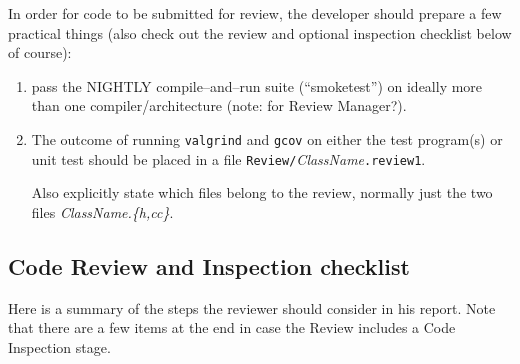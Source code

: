 \documentclass{article}
\begin{document}
In order for code to be submitted for review, the developer should prepare
a few practical things (also check out the review and optional
inspection checklist below of course):

\begin{enumerate}
\item
  pass the NIGHTLY compile--and--run suite (``smoketest'') on ideally more than
  one compiler/architecture (note: for Review Manager?).
\item
  The outcome of running {\tt valgrind} and {\tt gcov} on either the test
  program(s) or unit test should be placed in a file 
 {\tt Review/}{\it ClassName}{\tt .review1}.



Also explicitly state which files belong to the review, normally just the two
files {\it ClassName.\{h,cc\}}.

\end{enumerate}

\newpage
\subsection{Code Review and Inspection checklist}

Here is a summary of the steps the reviewer should consider in his report. Note
that there are a few items at the end in case the Review includes a Code
Inspection stage.
\end{document}
